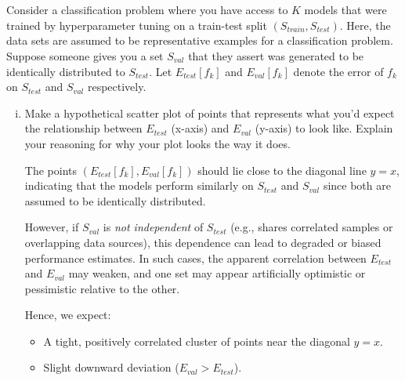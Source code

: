 \documentclass[a4paper]{article}
\begin{document}
\section{}
Consider a classification problem where you have access to $K$ models that were trained by hyperparameter tuning on a train-test split $(S_\mathit{train} , S_\mathit{test})$.
Here, the data sets are assumed to be representative examples for a classification problem.
Suppose someone gives you a set $S_\mathit{val}$ that they assert was generated to be identically distributed to $S_\mathit{test}$.
Let $E_\mathit{test} [f_k]$ and $E_\mathit{val} [f_k]$ denote the error of $f_k$ on $S_\mathit{test}$ and $S_\mathit{val}$ respectively.
\begin{enumerate}[(i)]
    \item Make a hypothetical scatter plot of points that represents what you’d expect the relationship between $E_\mathit{test}$ (x-axis) and $E_\mathit{val}$ (y-axis) to look like.
        Explain your reasoning for why your plot looks the way it does.

The points $(E_\mathit{test}[f_k], E_\mathit{val}[f_k])$ should lie close to the diagonal line $y = x$, indicating that the models perform similarly on $S_\mathit{test}$ and $S_\mathit{val}$ since both are assumed to be identically distributed.

However, if $S_\mathit{val}$ is \emph{not independent} of $S_\mathit{test}$ (e.g., shares correlated samples or overlapping data sources), this dependence can lead to degraded or biased performance estimates. In such cases, the apparent correlation between $E_\mathit{test}$ and $E_\mathit{val}$ may weaken, and one set may appear artificially optimistic or pessimistic relative to the other.

Hence, we expect:
\begin{itemize}
    \item A tight, positively correlated cluster of points near the diagonal $y = x$.
    \item Slight downward deviation ($E_\mathit{val} > E_\mathit{test}$).
\end{itemize}

\end{enumerate}
\end{document}
